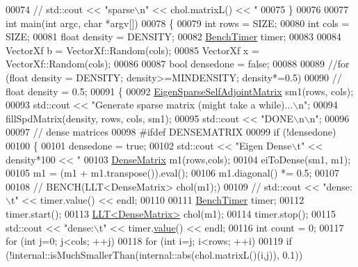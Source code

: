 \begin{DoxyCode}
00074 \textcolor{comment}{//   std::cout << "sparse\(\backslash\)n" << chol.matrixL() << "%
00075 \}
00076 
00077 \textcolor{keywordtype}{int} main(\textcolor{keywordtype}{int} argc, \textcolor{keywordtype}{char} *argv[])
00078 \{
00079   \textcolor{keywordtype}{int} rows = SIZE;
00080   \textcolor{keywordtype}{int} cols = SIZE;
00081   \textcolor{keywordtype}{float} density = DENSITY;
00082   \hyperlink{class_eigen_1_1_bench_timer}{BenchTimer} timer;
00083 
00084   VectorXf b = VectorXf::Random(cols);
00085   VectorXf x = VectorXf::Random(cols);
00086 
00087   \textcolor{keywordtype}{bool} densedone = \textcolor{keyword}{false};
00088 
00089   \textcolor{comment}{//for (float density = DENSITY; density>=MINDENSITY; density*=0.5)}
00090 \textcolor{comment}{//   float density = 0.5;}
00091   \{
00092     \hyperlink{group___sparse_core___module_class_eigen_1_1_sparse_matrix}{EigenSparseSelfAdjointMatrix} sm1(rows, cols);
00093     std::cout << \textcolor{stringliteral}{"Generate sparse matrix (might take a while)...\(\backslash\)n"};
00094     fillSpdMatrix(density, rows, cols, sm1);
00095     std::cout << \textcolor{stringliteral}{"DONE\(\backslash\)n\(\backslash\)n"};
00096 
00097     \textcolor{comment}{// dense matrices}
00098 \textcolor{preprocessor}{    #ifdef DENSEMATRIX}
00099     \textcolor{keywordflow}{if} (!densedone)
00100     \{
00101       densedone = \textcolor{keyword}{true};
00102       std::cout << \textcolor{stringliteral}{"Eigen Dense\(\backslash\)t"} << density*100 << \textcolor{stringliteral}{"%
00103       \hyperlink{group___core___module}{DenseMatrix} m1(rows,cols);
00104       eiToDense(sm1, m1);
00105       m1 = (m1 + m1.transpose()).eval();
00106       m1.diagonal() *= 0.5;
00107 
00108 \textcolor{comment}{//       BENCH(LLT<DenseMatrix> chol(m1);)}
00109 \textcolor{comment}{//       std::cout << "dense:\(\backslash\)t" << timer.value() << endl;}
00110 
00111       \hyperlink{class_eigen_1_1_bench_timer}{BenchTimer} timer;
00112       timer.start();
00113       \hyperlink{group___cholesky___module_class_eigen_1_1_l_l_t}{LLT<DenseMatrix>} chol(m1);
00114       timer.stop();
00115       std::cout << \textcolor{stringliteral}{"dense:\(\backslash\)t"} << timer.\hyperlink{class_eigen_1_1_bench_timer_a26760f963ed8b64c126159bfea57735e}{value}() << endl;
00116       \textcolor{keywordtype}{int} count = 0;
00117       \textcolor{keywordflow}{for} (\textcolor{keywordtype}{int} j=0; j<cols; ++j)
00118         \textcolor{keywordflow}{for} (\textcolor{keywordtype}{int} i=j; i<rows; ++i)
00119           \textcolor{keywordflow}{if} (!internal::isMuchSmallerThan(internal::abs(chol.matrixL()(i,j)), 0.1))
}}
\end{DoxyCode}
